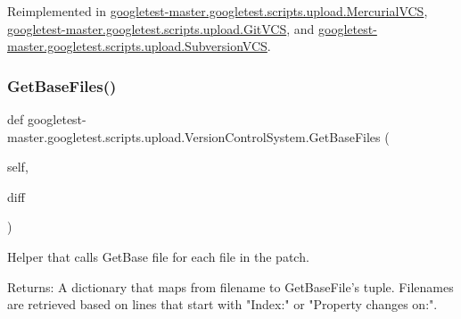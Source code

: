 Reimplemented in \mbox{\hyperlink{classgoogletest-master_1_1googletest_1_1scripts_1_1upload_1_1_mercurial_v_c_s_a7a235347ff9c9a5b31c965b979c7fd45}{googletest-\/master.\+googletest.\+scripts.\+upload.\+Mercurial\+V\+CS}}, \mbox{\hyperlink{classgoogletest-master_1_1googletest_1_1scripts_1_1upload_1_1_git_v_c_s_ae7a966e140897643c1af0b6d946cbb68}{googletest-\/master.\+googletest.\+scripts.\+upload.\+Git\+V\+CS}}, and \mbox{\hyperlink{classgoogletest-master_1_1googletest_1_1scripts_1_1upload_1_1_subversion_v_c_s_a6374a566b05895b119efb904440d65f6}{googletest-\/master.\+googletest.\+scripts.\+upload.\+Subversion\+V\+CS}}.

\mbox{\label{classgoogletest-master_1_1googletest_1_1scripts_1_1upload_1_1_version_control_system_a784606172c08d9c7e3c8d57bb9dd69a0}} 
\subsubsection{\texorpdfstring{GetBaseFiles()}{GetBaseFiles()}}
{\footnotesize\ttfamily def googletest-\/master.\+googletest.\+scripts.\+upload.\+Version\+Control\+System.\+Get\+Base\+Files (\begin{DoxyParamCaption}\item[{}]{self,  }\item[{}]{diff }\end{DoxyParamCaption})}

\begin{DoxyVerb}Helper that calls GetBase file for each file in the patch.

Returns:
  A dictionary that maps from filename to GetBaseFile's tuple.  Filenames
  are retrieved based on lines that start with "Index:" or
  "Property changes on:".
\end{DoxyVerb}
 \mbox{\label{classgoogletest-master_1_1googletest_1_1scripts_1_1upload_1_1_version_control_system_aef7e59b815e037806eb11d94ed512ba6}} 

